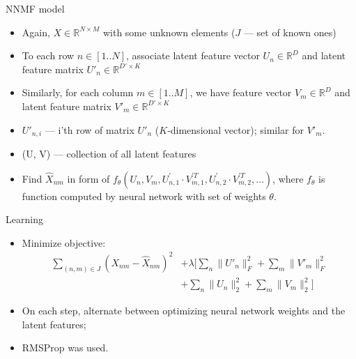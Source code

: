\documentclass{beamer}
\begin{document}
\begin{frame}{NNMF model}
    \begin{itemize}
        \item Again, $X \in \mathbb{R}^{N \times M}$ with some unknown elements ($J$ --- set of known ones)
        \item To each row $n \in [1..N]$, associate latent feature vector $U_n \in \mathbb{R}^D$ and latent feature matrix $U'_n \in \mathbb{R}^{D' \times K}$
        \item Similarly, for each column  $m \in [1..M]$, we have feature vector $V_m \in \mathbb{R}^D$ and latent feature matrix $V'_m \in \mathbb{R}^{D' \times K}$
        \item $U'_{n, i}$ --- i'th row of matrix $U'_n$ ($K$-dimensional vector); similar for $V'_m$.
        \item (U, V) --- collection of all latent features
        \item Find $\hat{X}_{nm}$ in form of $f_{\theta}(U_n, V_m, U^{'}_{n,1} \cdot V^{'T}_{m,1}, U^{'}_{n,2} \cdot V^{'T}_{m,2}, \ldots)$, where \newline $f_{\theta}$ is function computed by neural network with set of weights $\theta$.
    \end{itemize}
\end{frame}

\begin{frame}{Learning}
    \begin{itemize}
        \item Minimize objective:
        \begin{align*}
            \sum\limits_{(n, m) \in J} (X_{nm} - \hat{X}_{nm})^2 &+ \lambda \Bigg[ \sum\limits_{n} \|U'_n\|^2_F + \sum\limits_{m} \|V'_m\|^2_F \\
            & + \sum\limits_{n} \|U_n\|^2_2 + \sum\limits_{m} \|V_m\|^2_2 \Bigg]
        \end{align*}
        \item On each step, alternate between optimizing neural network weights and the latent features;
        \item RMSProp was used.
    \end{itemize}
\end{frame}
\end{document}
